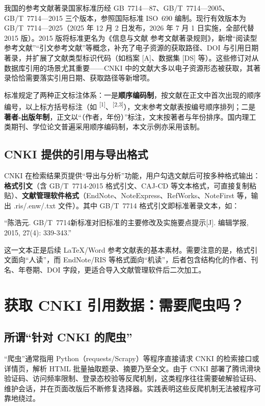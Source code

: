 \documentclass[UTF8, zihao=-4, fontset=fandol]{ctexart}
\begin{document}
我国的参考文献著录国家标准历经 GB~7714—87、GB/T~7714—2005、GB/T~7714—2015 三个版本，参照国际标准 ISO~690 编制\cite{gbt7714_2015,iso690_2021}。现行有效版本为 GB/T~7714—2025（2025 年 12 月 2 日发布，2026 年 7 月 1 日实施，全部代替 2015 版）\cite{gbt7714_2025}。2015 版将标准更名为《信息与文献 参考文献著录规则》，新增“阅读型参考文献”“引文参考文献”等概念，补充了电子资源的获取路径、DOI 与引用日期著录，并扩展了文献类型标识代码（如档案 [A]、数据集 [DS] 等）\cite{chen2015,hanyunbo2015}。这些修订对从数据库引用的场景尤其重要——CNKI 中的文献大多以电子资源形态被获取，其著录恰恰需要落实引用日期、获取路径等新增项。

标准规定了两种正文标注体系：一是\textbf{顺序编码制}，按文献在正文中首次出现的顺序编号，以上标方括号标注（如 \textsuperscript{[1]}、\textsuperscript{[2,3]}），文末参考文献表按编号顺序排列；二是\textbf{著者-出版年制}，正文以“（作者，年份）”标注，文末按著者与年份排序\cite{gbt7714_2015}。国内理工类期刊、学位论文普遍采用顺序编码制，本文示例亦采用该制。

\subsection{CNKI 提供的引用与导出格式}

CNKI 在检索结果页提供“导出与分析”功能，用户勾选文献后可按多种格式输出：\textbf{格式引文}（含 GB/T~7714-2015 格式引文、CAJ-CD 等文本格式，可直接复制粘贴）、\textbf{文献管理软件格式}（EndNote、NoteExpress、RefWorks、NoteFirst 等，输出 .ris/.enw/.txt 文件）。其中 GB/T~7714 格式引文即标准著录文本，如：

“陈浩元. GB/T~7714新标准对旧标准的主要修改及实施要点提示[J]. 编辑学报, 2015, 27(4): 339-343.”

这一文本正是后续 LaTeX/Word 参考文献表的基本素材。需要注意的是，格式引文面向“人读”，而 EndNote/RIS 等格式面向“机读”，后者包含结构化的作者、刊名、年卷期、DOI 字段，更适合导入文献管理软件后二次加工。

\section{获取 CNKI 引用数据：需要爬虫吗？}

\subsection{所谓“针对 CNKI 的爬虫”}

“爬虫”通常指用 Python（requests/Scrapy）等程序直接请求 CNKI 的检索接口或详情页，解析 HTML 批量抽取题录、摘要乃至全文。由于 CNKI 部署了腾讯滑块验证码、访问频率限制、登录态校验等反爬机制，这类程序往往需要破解验证码、维护会话，并在页面改版后不断修复选择器。实践表明这些反爬机制无法被程序可靠地绕过\cite{cnki_skills}。
\end{document}
